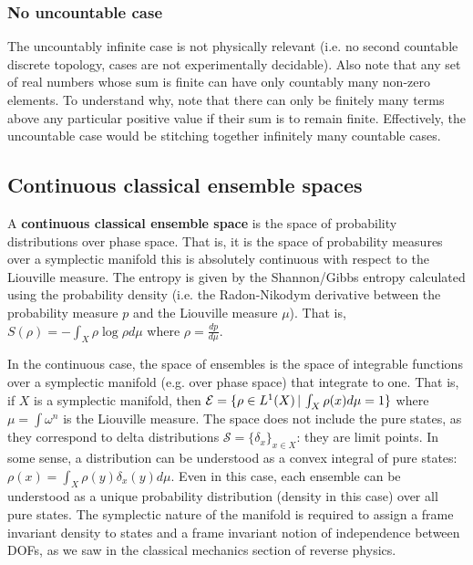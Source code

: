 \subsubsection{No uncountable case}

The uncountably infinite case is not physically relevant (i.e. no second countable discrete topology, cases are not experimentally decidable). Also note that any set of real numbers whose sum is finite can have only countably many non-zero elements. To understand why, note that there can only be finitely many terms above any particular positive value if their sum is to remain finite. Effectively, the uncountable case would be stitching together infinitely many countable cases.

\subsection{Continuous classical ensemble spaces}

\begin{defn}
	A \textbf{continuous classical ensemble space} is the space of probability distributions over phase space. That is, it is the space of probability measures over a symplectic manifold this is absolutely continuous with respect to the Liouville measure. The entropy is given by the Shannon/Gibbs entropy calculated using the probability density (i.e. the Radon-Nikodym derivative between the probability measure $p$ and the Liouville measure $\mu$). That is, $S(\rho) = - \int_X \rho \log \rho d\mu$ where $\rho = \frac{dp}{d\mu}$.
\end{defn}

In the continuous case, the space of ensembles is the space of integrable functions over a symplectic manifold (e.g.  over phase space) that integrate to one. That is, if $X$ is a symplectic manifold, then $\mathcal{E} = \{ \rho \in L^1(X) \, | \, \int_X \rho(x) d\mu = 1 \} $ where $\mu=\int \omega^n$ is the Liouville measure. The space does not include the pure states, as they correspond to delta distributions $\mathcal{S} = \{\delta_x\}_{x \in X}$: they are limit points. In some sense, a distribution can be understood as a convex integral of pure states: $\rho(x) = \int_X \rho(y) \delta_x(y) d\mu$. Even in this case, each ensemble can be understood as a unique probability distribution (density in this case) over all pure states. The symplectic nature of the manifold is required to assign a frame invariant density to states and a frame invariant notion of independence between DOFs, as we saw in the classical mechanics section of reverse physics.

